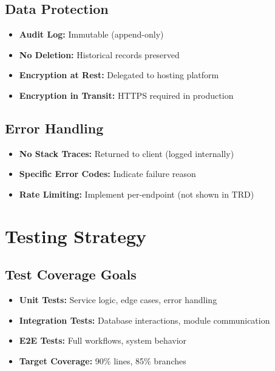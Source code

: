\documentclass[12pt,a4paper]{article}
\begin{document}
\subsection{Data Protection}

\begin{itemize}
    \item \textbf{Audit Log:} Immutable (append-only)
    \item \textbf{No Deletion:} Historical records preserved
    \item \textbf{Encryption at Rest:} Delegated to hosting platform
    \item \textbf{Encryption in Transit:} HTTPS required in production
\end{itemize}

\subsection{Error Handling}

\begin{itemize}
    \item \textbf{No Stack Traces:} Returned to client (logged internally)
    \item \textbf{Specific Error Codes:} Indicate failure reason
    \item \textbf{Rate Limiting:} Implement per-endpoint (not shown in TRD)
\end{itemize}

\newpage

\section{Testing Strategy}

\subsection{Test Coverage Goals}

\begin{itemize}
    \item \textbf{Unit Tests:} Service logic, edge cases, error handling
    \item \textbf{Integration Tests:} Database interactions, module communication
    \item \textbf{E2E Tests:} Full workflows, system behavior
    \item \textbf{Target Coverage:} 90\% lines, 85\% branches
\end{itemize}
\end{document}
